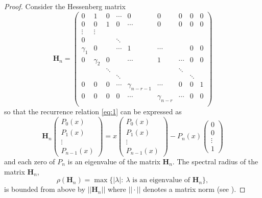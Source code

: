 \documentclass[12pt]{article}
\numberwithin{equation}{section}
\begin{document}
\begin{proof} Consider the Hessenberg matrix 
\begin{equation}\label{Hn}
	\mathbf{H}_n = \left( 
		\begin{array}{ccccccccc}
			0 		 & 1 			& 0 &  \cdots & 0 & 0 & 0 & 0 & 0\\
			0 		 & 0 			& 1 & 0 & \cdots & 0 & 0 & 0 & 0\\
			\vdots & \vdots & \\
			0	&   &   & \ddots \\
			\gamma_1 & 0 			&  & \cdots &  1 & \cdots &  & 0 & 0 \\
			0 		 & \gamma_2 	& 0 &  & \cdots & 1 & \cdots & 0 & 0 \\
			    		 &   &   \ddots&    &   &      &   \ddots&  & \\
					&   &  &   \ddots &   &   &      & \ddots  &  \\
			   		0 & 0  & 0 & \cdots &  \gamma_{n-r-1}  & \cdots &   0&   0& 1 \\
			   		 0 &   0&  0&0  & \cdots &   \gamma_{n-r}  &   \cdots &   0& 0  \\
		\end{array}
	\right)
\end{equation}
so that the recurrence relation \eqref{eq:1} can be expressed as 
\[
	\mathbf{H}_n \left(\begin{array}{c} P_0(x) \\ P_1(x) \\ \vdots \\ P_{n-1}(x)\end{array}\right)
	= x \left(\begin{array}{c} P_0(x) \\ P_1(x) \\ \vdots \\ P_{n-1}(x)\end{array}\right)
	- P_n(x) \left(\begin{array}{c} 0 \\ 0\\ \vdots \\ 1\end{array}\right)
\]
and each zero of $P_n$ is an eigenvalue of the matrix $\mathbf{H}_n$. 
The spectral radius of the matrix $\mathbf{H}_n$, 
\[
	\rho(\mathbf{H}_n) = \max \{ |\lambda| : \ \lambda \text{ is an eigenvalue of } \mathbf{H}_n\}, 
\]
is bounded from above by  $|| \mathbf{H}_n ||$ where $|| \cdot ||$ denotes a matrix norm (see \cite[Section 5.6]{HJ}). 

\end{proof}
\end{document}
